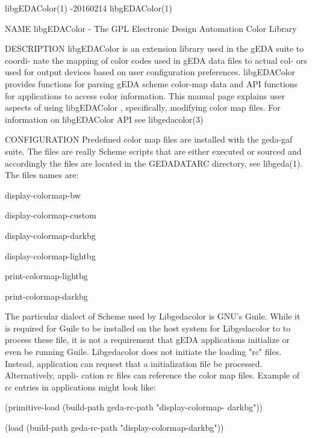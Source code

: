 libgEDAColor(1)                    -20160214                   libgEDAColor(1)



NAME
       libgEDAColor - The GPL Electronic Design Automation Color Library

DESCRIPTION
       libgEDAColor  is an extension library used in the gEDA suite to coordi-
       nate the mapping of color codes used in gEDA data files to actual  col-
       ors  used  for  output devices based on user configuration preferences.
       libgEDAColor provides functions for parsing gEDA scheme color-map  data
       and  API  functions  for applications to access color information. This
       manual page explains user aspects of using libgEDAColor , specifically,
       modifying  color  map  files.  For  information on libgEDAColor API see
       libgedacolor(3)

CONFIGURATION
       Predefined color map files are installed with the geda-gaf  suite.  The
       files are really Scheme scripts that are either executed or sourced and
       accordingly the files are located  in  the  GEDADATARC  directory,  see
       libgeda(1).  The files names are:

              display-colormap-bw

              display-colormap-custom

              display-colormap-darkbg

              display-colormap-lightbg

              print-colormap-lightbg

              print-colormap-darkbg

       The  particular  dialect of Scheme used by Libgedacolor is GNU's Guile.
       While it is required for Guile to be installed on the host  system  for
       Libgedacolor  to  to  process  these file, it is not a requirement that
       gEDA applications initialize or even be  running  Guile.   Libgedacolor
       does  not  initiate  the  loading  "rc" files. Instead, application can
       request that a initialization file be processed. Alternatively,  appli-
       cation  rc  files  can  reference  the  color  map files. Example of rc
       entries in applications might look like:

              (primitive-load  (build-path   geda-rc-path   "display-colormap-
              darkbg"))

              (load (build-path geda-rc-path "display-colormap-darkbg"))

